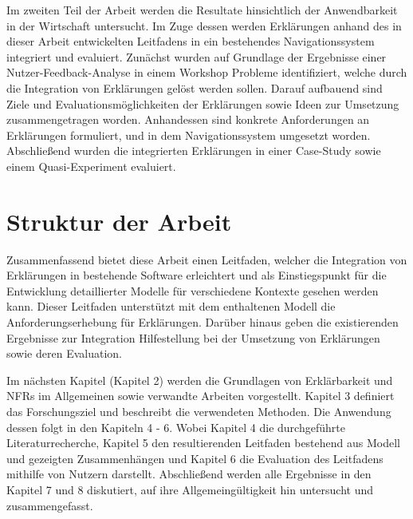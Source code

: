 Im zweiten Teil der Arbeit werden die Resultate hinsichtlich der Anwendbarkeit in der Wirtschaft untersucht. Im Zuge dessen werden Erklärungen anhand des in dieser Arbeit entwickelten Leitfadens in ein bestehendes Navigationssystem integriert und evaluiert. Zunächst wurden auf Grundlage der Ergebnisse einer Nutzer-Feedback-Analyse in einem Workshop Probleme identifiziert, welche durch die Integration von Erklärungen gelöst werden sollen. Darauf aufbauend sind Ziele und Evaluationsmöglichkeiten der Erklärungen sowie Ideen zur Umsetzung zusammengetragen worden. Anhandessen sind konkrete Anforderungen an Erklärungen formuliert, und in dem Navigationssystem umgesetzt worden. Abschließend wurden die integrierten Erklärungen in einer Case-Study sowie einem Quasi-Experiment evaluiert.

\section{Struktur der Arbeit}

Zusammenfassend bietet diese Arbeit einen Leitfaden, welcher die Integration von Erklärungen in bestehende Software erleichtert und als Einstiegspunkt für die Entwicklung detaillierter Modelle für verschiedene Kontexte gesehen werden kann. Dieser Leitfaden unterstützt mit dem enthaltenen Modell die Anforderungserhebung für Erklärungen. Darüber hinaus geben die existierenden Ergebnisse zur Integration Hilfestellung bei der Umsetzung von Erklärungen sowie deren Evaluation.

Im nächsten Kapitel (Kapitel 2) werden die Grundlagen von Erklärbarkeit und NFRs im Allgemeinen sowie verwandte Arbeiten vorgestellt. Kapitel 3 definiert das Forschungsziel und beschreibt die verwendeten Methoden. Die Anwendung dessen folgt in den Kapiteln 4 - 6. Wobei Kapitel 4 die durchgeführte Literaturrecherche, Kapitel 5 den resultierenden Leitfaden bestehend aus Modell und gezeigten Zusammenhängen und Kapitel 6 die Evaluation des Leitfadens mithilfe von Nutzern darstellt. Abschließend werden alle Ergebnisse in den Kapitel 7 und 8 diskutiert, auf ihre Allgemeingültigkeit hin untersucht und zusammengefasst.